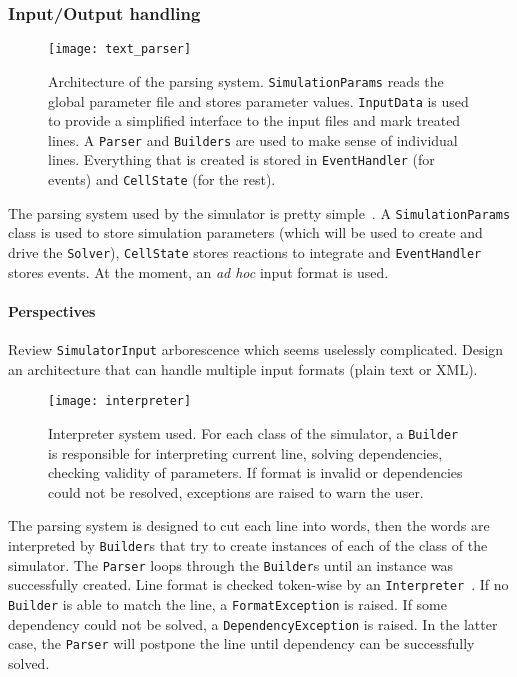 
\subsubsection{Input/Output handling}


\begin{figure}[!h]
  \centering
  \texttt{[image: text\_parser]}
  \caption{Architecture of the parsing system. \texttt{SimulationParams} reads the global parameter file and stores parameter values. \texttt{InputData} is used to provide a simplified interface to the input files and mark treated lines. A \texttt{Parser} and \texttt{Builders} are used to make sense of individual lines. Everything that is created is stored in \texttt{EventHandler} (for events) and \texttt{CellState} (for the rest). }
  \label{fig:text_parser}
\end{figure}

The parsing system used by the simulator is pretty simple~. A \texttt{SimulationParams} class is used to store simulation parameters (which will be used to create and drive the \texttt{Solver}), \texttt{CellState} stores reactions to integrate and \texttt{EventHandler} stores events. At the moment, an \textit{ad hoc} input format is used.

\paragraph{Perspectives} Review \texttt{SimulatorInput} arborescence which seems uselessly complicated. Design an architecture that can handle multiple input formats (plain text or XML).


\begin{figure}[!h]
  \centering
  \texttt{[image: interpreter]}
  \caption{Interpreter system used. For each class of the simulator, a \texttt{Builder} is responsible for interpreting current line, solving dependencies, checking validity of parameters. If format is invalid or dependencies could not be resolved, exceptions are raised to warn the user.}
  \label{fig:interpreter}
\end{figure}

The parsing system is designed to cut each line into words, then the words are interpreted by \texttt{Builder}s that try to create instances of each of the class of the simulator. The \texttt{Parser} loops through the \texttt{Builder}s until an instance was successfully created. Line format is checked token-wise by an \texttt{Interpreter}~. If no \texttt{Builder} is able to match the line, a \texttt{FormatException} is raised. If some dependency could not be solved, a \texttt{DependencyException} is raised. In the latter case, the \texttt{Parser} will postpone the line until dependency can be successfully solved.


